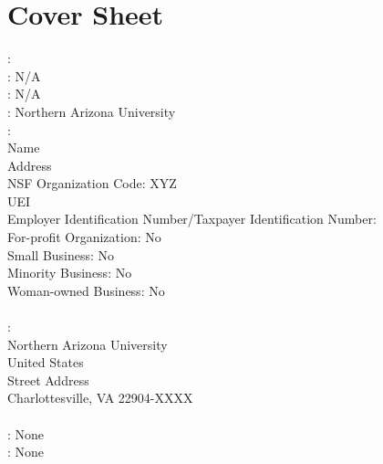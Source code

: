 
\section{Cover Sheet}

\noindent {}: 
\\

\noindent {}: N/A
\\

\noindent {}: N/A
\\

\noindent {}: Northern Arizona University
\\

\noindent {}:    \\
\indent Name \\
\indent Address \\
\indent NSF Organization Code: XYZ \\
\indent UEI \\
\indent Employer Identification Number/Taxpayer Identification Number:  \\
\indent For-profit Organization: No\\
\indent Small Business: No\\
\indent Minority Business: No\\
\indent Woman-owned Business: No\\
\\

\noindent {}:    \\
\indent Northern Arizona University \\
\indent United States \\
\indent Street Address\\
\indent Charlottesville, VA 22904-XXXX\\
\\

\noindent {}: None
\\

\noindent {}: None
\\

